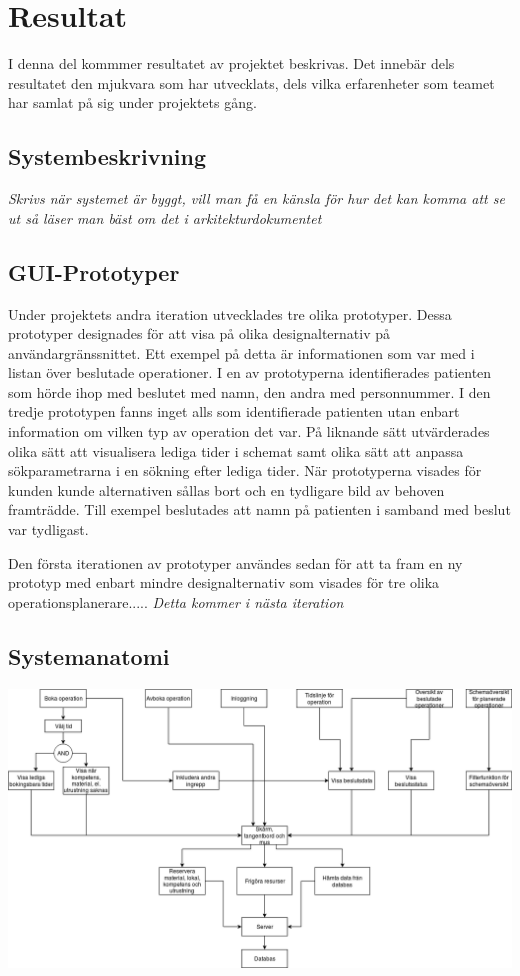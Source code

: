 \chapter{Resultat}
I denna del kommmer resultatet av projektet beskrivas. Det innebär dels
resultatet den mjukvara som har utvecklats, dels vilka erfarenheter som
teamet har samlat på sig under projektets gång.
\section{Systembeskrivning}
\textit{Skrivs när systemet är byggt, vill man få en känsla för hur det kan
komma att se ut så läser man bäst om det i arkitekturdokumentet}
\section{GUI-Prototyper}
Under projektets andra iteration utvecklades tre olika prototyper. Dessa
prototyper designades för att visa på olika designalternativ på
användargränssnittet. Ett exempel på detta är informationen som var med i listan
över beslutade operationer. I en av prototyperna identifierades patienten som hörde
ihop med beslutet med namn, den andra med personnummer. I den tredje prototypen
fanns inget alls som identifierade patienten utan enbart information om vilken
typ av operation det var. På liknande sätt utvärderades olika sätt att
visualisera lediga tider i schemat samt olika sätt att anpassa sökparametrarna i
en sökning efter lediga tider. När prototyperna visades för kunden kunde alternativen sållas bort och en tydligare bild av behoven framträdde.
Till exempel beslutades att namn på patienten i samband med beslut var tydligast.

Den första iterationen av prototyper användes sedan för att ta fram en ny
prototyp med enbart mindre designalternativ som visades för tre olika
operationsplanerare.....
\textit{Detta kommer i nästa iteration}
\section{Systemanatomi}
\includegraphics[width=\textwidth,height=.4\textheight]{Figures/Systemanatomi.png}\\

